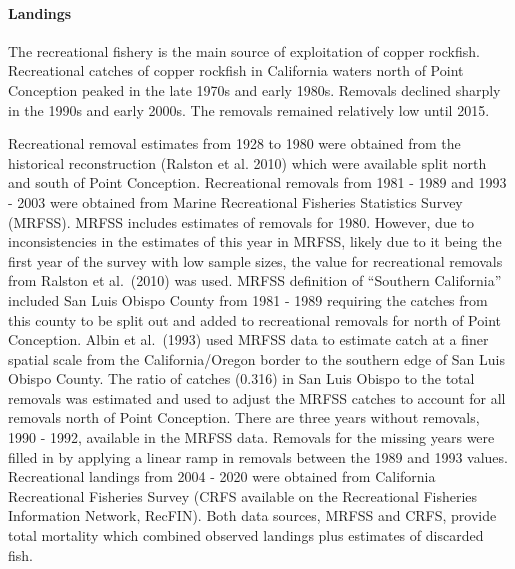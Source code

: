 \documentclass[11pt,
  english,
  a4paper,
]{article}
\begin{document}

\hypertarget{landings-1}{%
\paragraph{Landings}\label{landings-1}}

\leavevmode\tagmcend\tagstructend


The recreational fishery is the main source of exploitation of copper rockfish. Recreational catches of copper rockfish in California waters north of Point Conception peaked in the late 1970s and early 1980s. Removals declined sharply in the 1990s and early 2000s. The removals remained relatively low until 2015.

\leavevmode\tagmcend\tagstructend\par


Recreational removal estimates from 1928 to 1980 were obtained from the historical reconstruction {(Ralston et al. 2010)\leavevmode\tagmcend\tagstructend} which were available split north and south of Point Conception. Recreational removals from 1981 - 1989 and 1993 - 2003 were obtained from Marine Recreational Fisheries Statistics Survey (MRFSS). MRFSS includes estimates of removals for 1980. However, due to inconsistencies in the estimates of this year in MRFSS, likely due to it being the first year of the survey with low sample sizes, the value for recreational removals from Ralston et al.~{(2010)\leavevmode\tagmcend\tagstructend} was used. MRFSS definition of ``Southern California'' included San Luis Obispo County from 1981 - 1989 requiring the catches from this county to be split out and added to recreational removals for north of Point Conception. Albin et al.~{(1993)\leavevmode\tagmcend\tagstructend} used MRFSS data to estimate catch at a finer spatial scale from the California/Oregon border to the southern edge of San Luis Obispo County. The ratio of catches (0.316) in San Luis Obispo to the total removals was estimated and used to adjust the MRFSS catches to account for all removals north of Point Conception. There are three years without removals, 1990 - 1992, available in the MRFSS data. Removals for the missing years were filled in by applying a linear ramp in removals between the 1989 and 1993 values. Recreational landings from 2004 - 2020 were obtained from California Recreational Fisheries Survey (CRFS available on the Recreational Fisheries Information Network, RecFIN). Both data sources, MRFSS and CRFS, provide total mortality which combined observed landings plus estimates of discarded fish.
\end{document}
